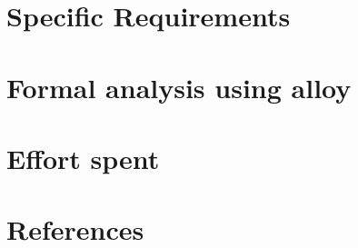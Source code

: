 \documentclass{config/PoliMi3i_thesis}
\begin{document}
\chapter{Specific Requirements}


\chapter{Formal analysis using alloy}


\chapter{Effort spent}


\chapter{References}





\listoffigures
\listoftables

\cleardoublepage
\end{document}
